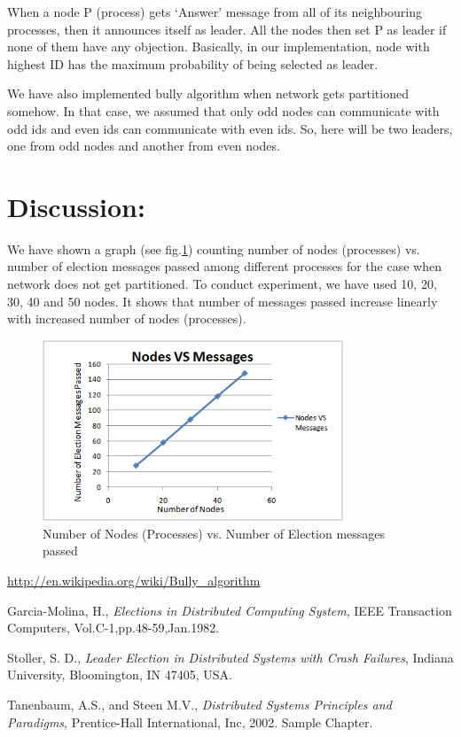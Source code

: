 \documentclass{article}
\begin{document}
When a node P (process) gets `Answer' message from all of its neighbouring processes, then it announces itself as leader. All the nodes then set P as leader if none of them have any objection. Basically, in our implementation, node with highest ID has the maximum probability of being selected as leader. 

We have also implemented bully algorithm when network gets partitioned somehow. In that case, we assumed that only odd nodes can communicate with odd ids and even ids can communicate with even ids. So, here will be two leaders, one from odd nodes and another from even nodes.

\section*{Discussion:}

We have shown a graph (see fig.\ref{fig:image}) counting number of nodes (processes) vs. number of election messages passed among different processes for the case when network does not get partitioned. To conduct experiment, we have used 10, 20, 30, 40 and 50 nodes. It shows that number of messages passed increase linearly with increased number of nodes (processes).
\begin{figure}
    \centering
    \includegraphics[width=0.8\textwidth]{bully.png}
    \caption{Number of Nodes (Processes) vs. Number of Election messages passed}
    \label{fig:image}
\end{figure}

\begin{thebibliography}{1}

 \url{http://en.wikipedia.org/wiki/Bully_algorithm}

 Garcia-Molina, H., \emph{Elections in Distributed Computing System}, IEEE Transaction  Computers, Vol.C-1,pp.48-59,Jan.1982.

 Stoller, S. D., \emph{Leader Election in Distributed Systems with Crash Failures}, Indiana University, Bloomington, IN 47405, USA.

 Tanenbaum, A.S., and Steen M.V.,  \emph{Distributed Systems Principles and Paradigms},  Prentice-Hall International, Inc, 2002. Sample Chapter. 

\end{thebibliography}
\end{document}
